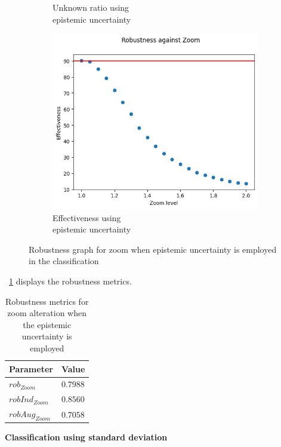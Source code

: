 \begin{figure}[h]
\begin{subfigure}{.33\textwidth}
		\caption{Unknown ratio using \\ epistemic uncertainty}
		\label{fig:zo_eu_unkn}
	\end{subfigure}%
	\begin{subfigure}{.33\textwidth}
		\centering
		\includegraphics[width=0.9\linewidth]{ImageFiles/EvalBNN/ZO/EU/eff}
		\caption{Effectiveness using \\ epistemic uncertainty}
		\label{fig:zo_eu_eff}
	\end{subfigure}
	\caption{Robustness graph for zoom when epistemic uncertainty is employed in the classification}
	\label{fig:zo_eu}
\end{figure}

\Tab~\ref{table:rob_zo_eu} displays the robustness metrics.

\begin{table}[h]
	\centering
	\begin{tabular}{|| l | l ||} 
		\hline
		\textbf{Parameter} & \textbf{Value} \\
		\hline
		\hline
		$rob_{Zoom}$ & $0.7988$ \\
		$robInd_{Zoom}$ & $0.8560$ \\
		$robAug_{Zoom}$ & $0.7058$ \\	
		\hline
	\end{tabular}	
	\caption{Robustness metrics for zoom alteration when the epistemic uncertainty is employed}
	\label{table:rob_zo_eu}
\end{table}

\vspace{0.3cm}
\textbf{Classification using standard deviation}
\vspace{0.1cm}

